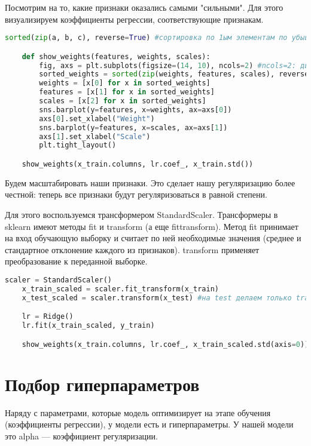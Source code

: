 Посмотрим на то, какие признаки оказались самыми "сильными". Для этого визуализируем коэффициенты регрессии, соответствующие признакам.

\begin{lstlisting}[language=Python]
	sorted(zip(a, b, c), reverse=True) #сортировка по 1ым элементам по убыванию

	def show_weights(features, weights, scales):
	    fig, axs = plt.subplots(figsize=(14, 10), ncols=2) #ncols=2: два графика (два столбца)
	    sorted_weights = sorted(zip(weights, features, scales), reverse=True) #сортировка по весам по убыванию
	    weights = [x[0] for x in sorted_weights]
	    features = [x[1] for x in sorted_weights]
	    scales = [x[2] for x in sorted_weights]
	    sns.barplot(y=features, x=weights, ax=axs[0])
	    axs[0].set_xlabel("Weight")
	    sns.barplot(y=features, x=scales, ax=axs[1])
	    axs[1].set_xlabel("Scale")
	    plt.tight_layout()

	show_weights(x_train.columns, lr.coef_, x_train.std())
\end{lstlisting}

Будем масштабировать наши признаки. Это сделает нашу регуляризацию более честной: теперь все признаки будут регуляризоваться в равной степени.

Для этого воспользуемся трансформером StandardScaler. Трансформеры в sklearn имеют методы fit и transform (а еще fittransform). Метод fit принимает на вход обучающую выборку и считает по ней необходимые значения (среднее и стандартное отклонение каждого из признаков). transform применяет преобразование к переданной выборке.

\begin{lstlisting}[language=Python]
	scaler = StandardScaler()
	x_train_scaled = scaler.fit_transform(x_train)
	x_test_scaled = scaler.transform(x_test) #на test делаем только transform!

	lr = Ridge()
	lr.fit(x_train_scaled, y_train)

	show_weights(x_train.columns, lr.coef_, x_train_scaled.std(axis=0)) #type(x_train_scaled
\end{lstlisting}

\section{Подбор гиперпараметров}\label{cha:linreg2/sec:hyperpar}

Наряду с параметрами, которые модель оптимизирует на этапе обучения (коэффициенты регрессии), у модели есть и гиперпараметры. У нашей модели это alpha — коэффициент регуляризации.

